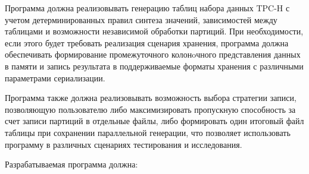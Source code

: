 Программа должна реализовывать генерацию таблиц набора данных TPC-H с учетом детерминированных правил синтеза значений, зависимостей между таблицами и возможности независимой обработки партиций. При необходимости, если этого будет требовать реализация сценария хранения, программа должна обеспечивать формирование промежуточного колонoчного представления данных в памяти и запись результата в поддерживаемые форматы хранения с различными параметрами сериализации.

Программа также должна реализовывать возможность выбора стратегии записи, позволяющую пользователю либо максимизировать пропускную способность за счет записи партиций в отдельные файлы, либо формировать один итоговый файл таблицы при сохранении параллельной генерации, что позволяет использовать программу в различных сценариях тестирования и исследования.

Разрабатываемая программа должна: 

